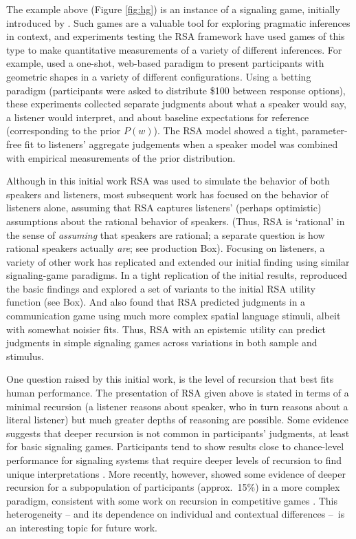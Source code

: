 \documentclass[]{elsarticle}
\begin{document}
The example above (Figure \ref{fig:hg}) is an instance of a signaling game,
initially introduced by \citet{lewis1965}. Such games are a valuable tool for
exploring pragmatic inferences in context, and experiments testing the
RSA framework have used games of this type to make quantitative
measurements of a variety of different inferences. For example, \citet{frank2012} used a one-shot, web-based paradigm to present
participants with geometric shapes in a variety of different
configurations. Using a betting paradigm (participants were asked to
distribute \$100 between response options), these experiments collected
separate judgments about what a speaker would say, a listener would
interpret, and about baseline expectations for reference (corresponding
to the prior $P(w)$). The RSA model showed a tight, parameter-free fit
to listeners' aggregate judgements when a speaker model was combined
with empirical measurements of the prior distribution.

Although in this initial work RSA was used to simulate the behavior of
both speakers and listeners, most subsequent work has focused on the
behavior of listeners alone, assuming that RSA captures listeners'
(perhaps optimistic) assumptions about the rational behavior of
speakers. (Thus, RSA is `rational' in the sense of \emph{assuming} that
speakers are rational; a separate question is how rational speakers
actually \emph{are}; see production Box). Focusing on listeners, a
variety of other work has replicated and extended our initial finding
using similar signaling-game paradigms. In a tight replication of the
initial results, \citet{qing2015} reproduced the basic findings and
explored a set of variants to the initial RSA utility function (see
Box). And \citet{carstensen2014} also found that RSA
predicted judgments in a communication game using much more complex
spatial language stimuli, albeit with somewhat noisier fits. Thus, RSA
with an epistemic utility can predict judgments in simple signaling
games across variations in both sample and stimulus.

One question raised by this initial work, is the level of recursion that
best fits human performance. The presentation of RSA given above is
stated in terms of a minimal recursion (a listener reasons about
speaker, who in turn reasons about a literal listener) but much greater
depths of reasoning are possible. Some evidence suggests that deeper
recursion is not common in participants' judgments, at least for basic
signaling games. Participants tend to show results close to chance-level
performance for signaling systems that require deeper levels of
recursion to find unique interpretations \citep{stiller2011,degen2012,vogel2013}. More recently,
however, \citet{franke2016} showed some evidence of deeper recursion
for a subpopulation of participants (approx.~15\%) in a more
complex paradigm, consistent with some work on recursion in competitive
games \citep{camerer2004}. This heterogeneity -- and its dependence
on individual and contextual differences --~is an interesting topic for
future work.
\end{document}
